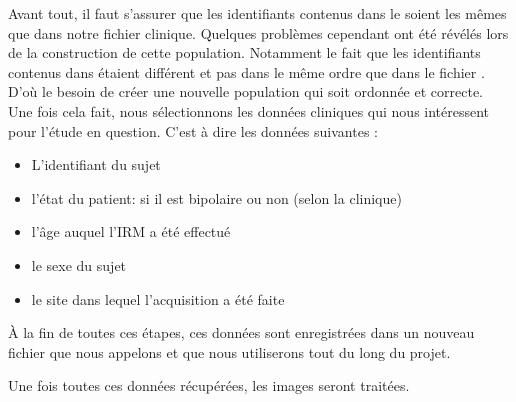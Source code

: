 Avant tout, il faut s'assurer que les identifiants contenus dans le  soient les mêmes que dans notre fichier clinique.
Quelques problèmes cependant ont été révélés lors de la construction de cette population. Notamment le fait que les identifiants contenus dans  étaient différent et pas dans le même ordre que dans le fichier .
D'où le besoin de créer une nouvelle population qui soit ordonnée et correcte. 
Une fois cela fait, nous sélectionnons les données cliniques qui nous intéressent pour l'étude en question. C'est à dire les données suivantes : 
\begin{itemize}
	\item L'identifiant du sujet
	\item l'état du patient: si il est bipolaire ou non (selon la clinique)
	\item l'âge auquel l'IRM a été effectué
	\item le sexe du sujet
	\item le site dans lequel l'acquisition a été faite 
\end{itemize}

À la fin de toutes ces étapes, ces données sont enregistrées dans un nouveau fichier que nous appelons  et que nous utiliserons tout du long du projet.


Une fois toutes ces données récupérées, les images seront traitées. 